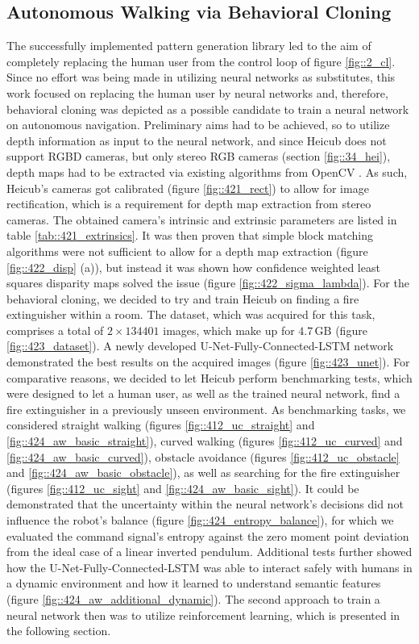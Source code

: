 \subsection{Autonomous Walking via Behavioral Cloning}
The successfully implemented pattern generation library led to the aim of completely replacing the human user from the control loop of figure \ref{fig::2_cl}. Since no effort was being made in utilizing neural networks as substitutes, this work focused on replacing the human user by neural networks and, therefore, behavioral cloning was depicted as a possible candidate to train a neural network on autonomous navigation. Preliminary aims had to be achieved, so to utilize depth information as input to the neural network, and since Heicub does not support RGBD cameras, but only stereo RGB cameras (section \ref{fig::34_hei}), depth maps had to be extracted via existing algorithms from OpenCV \cite{opencv_library}. As such, Heicub's cameras got calibrated (figure \ref{fig::421_rect}) to allow for image rectification, which is a requirement for depth map extraction from stereo cameras. The obtained camera's intrinsic and extrinsic parameters are listed in table \ref{tab::421_extrinsics}. It was then proven that simple block matching algorithms were not sufficient to allow for a depth map extraction (figure \ref{fig::422_disp} (a)), but instead it was shown how confidence weighted least squares disparity maps solved the issue (figure \ref{fig::422_sigma_lambda}). For the behavioral cloning, we decided to try and train Heicub on finding a fire extinguisher within a room. The dataset, which was acquired for this task, comprises a total of $2\times134401$ images, which make up for $4.7\,\text{GB}$ (figure \ref{fig::423_dataset}). A newly developed U-Net-Fully-Connected-LSTM network demonstrated the best results on the acquired images (figure \ref{fig::423_unet}). For comparative reasons, we decided to let Heicub perform benchmarking tests, which were designed to let a human user, as well as the trained neural network, find a fire extinguisher in a previously unseen environment. As benchmarking tasks, we considered straight walking (figures \ref{fig::412_uc_straight} and \ref{fig::424_aw_basic_straight}), curved walking (figures \ref{fig::412_uc_curved} and \ref{fig::424_aw_basic_curved}), obstacle avoidance (figures \ref{fig::412_uc_obstacle} and \ref{fig::424_aw_basic_obstacle}), as well as searching for the fire extinguisher (figures \ref{fig::412_uc_sight} and \ref{fig::424_aw_basic_sight}). It could be demonstrated that the uncertainty within the neural network's decisions did not influence the robot's balance (figure \ref{fig::424_entropy_balance}), for which we evaluated the command signal's entropy against the zero moment point deviation from the ideal case of a linear inverted pendulum. Additional tests further showed how the U-Net-Fully-Connected-LSTM was able to interact safely with humans in a dynamic environment and how it learned to understand semantic features (figure \ref{fig::424_aw_additional_dynamic}). The second approach to train a neural network then was to utilize reinforcement learning, which is presented in the following section.
